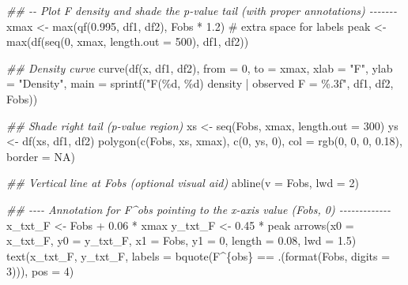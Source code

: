 \documentclass[
  letterpaper,
]{scrbook}
\newenvironment{Shaded}{\begin{snugshade}}{\end{snugshade}}
\newcommand{\AttributeTok}[1]{\textcolor[rgb]{0.40,0.45,0.13}{#1}}
\newcommand{\CommentTok}[1]{\textcolor[rgb]{0.37,0.37,0.37}{#1}}
\newcommand{\ConstantTok}[1]{\textcolor[rgb]{0.56,0.35,0.01}{#1}}
\newcommand{\DecValTok}[1]{\textcolor[rgb]{0.68,0.00,0.00}{#1}}
\newcommand{\DocumentationTok}[1]{\textcolor[rgb]{0.37,0.37,0.37}{\textit{#1}}}
\newcommand{\FloatTok}[1]{\textcolor[rgb]{0.68,0.00,0.00}{#1}}
\newcommand{\FunctionTok}[1]{\textcolor[rgb]{0.28,0.35,0.67}{#1}}
\newcommand{\NormalTok}[1]{\textcolor[rgb]{0.00,0.23,0.31}{#1}}
\newcommand{\OtherTok}[1]{\textcolor[rgb]{0.00,0.23,0.31}{#1}}
\newcommand{\SpecialCharTok}[1]{\textcolor[rgb]{0.37,0.37,0.37}{#1}}
\newcommand{\StringTok}[1]{\textcolor[rgb]{0.13,0.47,0.30}{#1}}
\begin{document}
\begin{Shaded}
\begin{Highlighting}[]
\DocumentationTok{\#\# {-}{-} Plot F density and shade the p{-}value tail (with proper annotations) {-}{-}{-}{-}{-}{-}{-}}
\NormalTok{xmax }\OtherTok{\textless{}{-}} \FunctionTok{max}\NormalTok{(}\FunctionTok{qf}\NormalTok{(}\FloatTok{0.995}\NormalTok{, df1, df2), Fobs }\SpecialCharTok{*} \FloatTok{1.2}\NormalTok{)  }\CommentTok{\# extra space for labels}
\NormalTok{peak }\OtherTok{\textless{}{-}} \FunctionTok{max}\NormalTok{(}\FunctionTok{df}\NormalTok{(}\FunctionTok{seq}\NormalTok{(}\DecValTok{0}\NormalTok{, xmax, }\AttributeTok{length.out =} \DecValTok{500}\NormalTok{), df1, df2))}

\DocumentationTok{\#\# Density curve}
\FunctionTok{curve}\NormalTok{(}\FunctionTok{df}\NormalTok{(x, df1, df2), }\AttributeTok{from =} \DecValTok{0}\NormalTok{, }\AttributeTok{to =}\NormalTok{ xmax,}
      \AttributeTok{xlab =} \StringTok{"F"}\NormalTok{, }\AttributeTok{ylab =} \StringTok{"Density"}\NormalTok{,}
      \AttributeTok{main =} \FunctionTok{sprintf}\NormalTok{(}\StringTok{"F(\%d, \%d) density  |  observed F = \%.3f"}\NormalTok{, df1, df2, Fobs))}

\DocumentationTok{\#\# Shade right tail (p{-}value region)}
\NormalTok{xs }\OtherTok{\textless{}{-}} \FunctionTok{seq}\NormalTok{(Fobs, xmax, }\AttributeTok{length.out =} \DecValTok{300}\NormalTok{)}
\NormalTok{ys }\OtherTok{\textless{}{-}} \FunctionTok{df}\NormalTok{(xs, df1, df2)}
\FunctionTok{polygon}\NormalTok{(}\FunctionTok{c}\NormalTok{(Fobs, xs, xmax), }\FunctionTok{c}\NormalTok{(}\DecValTok{0}\NormalTok{, ys, }\DecValTok{0}\NormalTok{),}
        \AttributeTok{col =} \FunctionTok{rgb}\NormalTok{(}\DecValTok{0}\NormalTok{, }\DecValTok{0}\NormalTok{, }\DecValTok{0}\NormalTok{, }\FloatTok{0.18}\NormalTok{), }\AttributeTok{border =} \ConstantTok{NA}\NormalTok{)}

\DocumentationTok{\#\# Vertical line at Fobs (optional visual aid)}
\FunctionTok{abline}\NormalTok{(}\AttributeTok{v =}\NormalTok{ Fobs, }\AttributeTok{lwd =} \DecValTok{2}\NormalTok{)}

\DocumentationTok{\#\# {-}{-}{-}{-} Annotation for F\^{}obs pointing to the x{-}axis value (Fobs, 0) {-}{-}{-}{-}{-}{-}{-}{-}{-}{-}{-}{-}{-}}
\NormalTok{x\_txt\_F }\OtherTok{\textless{}{-}}\NormalTok{ Fobs }\SpecialCharTok{+} \FloatTok{0.06} \SpecialCharTok{*}\NormalTok{ xmax}
\NormalTok{y\_txt\_F }\OtherTok{\textless{}{-}} \FloatTok{0.45} \SpecialCharTok{*}\NormalTok{ peak}
\FunctionTok{arrows}\NormalTok{(}\AttributeTok{x0 =}\NormalTok{ x\_txt\_F, }\AttributeTok{y0 =}\NormalTok{ y\_txt\_F, }\AttributeTok{x1 =}\NormalTok{ Fobs, }\AttributeTok{y1 =} \DecValTok{0}\NormalTok{,}
       \AttributeTok{length =} \FloatTok{0.08}\NormalTok{, }\AttributeTok{lwd =} \FloatTok{1.5}\NormalTok{)}
\FunctionTok{text}\NormalTok{(x\_txt\_F, y\_txt\_F,}
     \AttributeTok{labels =} \FunctionTok{bquote}\NormalTok{(F}\SpecialCharTok{\^{}}\NormalTok{\{obs\} }\SpecialCharTok{==}\NormalTok{ .(}\FunctionTok{format}\NormalTok{(Fobs, }\AttributeTok{digits =} \DecValTok{3}\NormalTok{))),}
     \AttributeTok{pos =} \DecValTok{4}\NormalTok{)}


\end{Highlighting}
\end{Shaded}
\end{document}
